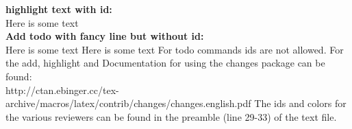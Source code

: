 \documentclass[11pt, showtrims, final, oldfontcommands]{memoir}
\begin{document}
\textbf{highlight text with id:}\\
Here is some text
\\

\textbf{Add todo with fancy line but without id:}\\
Here is some text 
 Here is some text
\newline 
\newline
\newline
\newline 
\newline
\newline
For todo commands ids are not allowed. For the add, highlight and
Documentation for using the changes package can be found:\\
http://ctan.ebinger.cc/tex-archive/macros/latex/contrib/changes/changes.english.pdf
\newline
The ids and colors for the various reviewers can be found in the preamble (line 29-33) of the text file.








\cleardoublepage

\setupparasubsecs
\setupmaintoc
\tableofcontents
\setlength{\unitlength}{1pt}
\cleardoublepage




\mainmatter








\backmatter

%


\listoftodos
\listofchanges[style=list, show=all]
\end{document}
